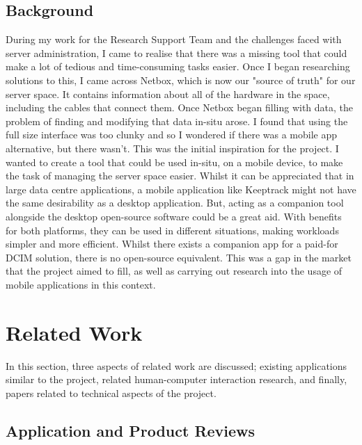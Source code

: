 \documentclass [11pt,a4paper]{article}
\begin{document}
\subsection{Background}
\label{sec:background}
During my work for the Research Support Team and the challenges faced with server administration, I came to realise that there was a missing tool that could make a lot of tedious and time-consuming tasks easier. Once I began researching solutions to this, I came across Netbox, which is now our "source of truth" for our server space. It contains information about all of the hardware in the space, including the cables that connect them. Once Netbox began filling with data, the problem of finding and modifying that data in-situ arose. I found that using the full size interface was too clunky and so I wondered if there was a mobile app alternative, but there wasn't. This was the initial inspiration for the project. I wanted to create a tool that could be used in-situ, on a mobile device, to make the task of managing the server space easier. Whilst it can be appreciated that in large data centre applications, a mobile application like Keeptrack might not have the same desirability as a desktop application. But, acting as a companion tool alongside the desktop open-source software could be a great aid. With benefits for both platforms, they can be used in different situations, making workloads simpler and more efficient. Whilst there exists a companion app for a paid-for DCIM solution, there is no open-source equivalent. This was a gap in the market that the project aimed to fill, as well as carrying out research into the usage of mobile applications in this context.

\pagebreak

\section{Related Work}

In this section, three aspects of related work are discussed; existing applications similar to the project, related human-computer interaction research, and finally, papers related to technical aspects of the project.

\subsection{Application and Product Reviews}
\label{sec:app_reviews}
\end{document}
